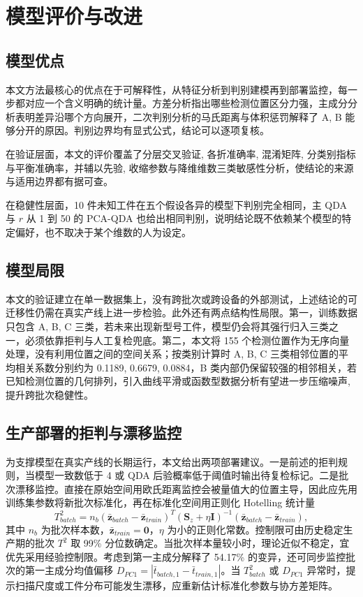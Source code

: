 \documentclass[12pt,a4paper]{article}
\newcommand{\upcite}[1]{\cite{#1}}
\begin{document}
\section{模型评价与改进}
\subsection{模型优点}

本文方法最核心的优点在于可解释性，从特征分析到判别建模再到部署监控，每一步都对应一个含义明确的统计量。方差分析指出哪些检测位置区分力强，主成分分析表明差异沿哪个方向展开，二次判别分析的马氏距离与体积惩罚解释了 A, B 能够分开的原因。判别边界均有显式公式，结论可以逐项复核。

在验证层面，本文的评价覆盖了分层交叉验证, 各折准确率, 混淆矩阵, 分类别指标与平衡准确率，并辅以先验, 收缩参数与降维维数三类敏感性分析，使结论的来源与适用边界都有据可查。

在稳健性层面，10 件未知工件在五个假设各异的模型下判别完全相同，主 QDA 与 $r$ 从 1 到 50 的 PCA-QDA 也给出相同判别，说明结论既不依赖某个模型的特定偏好，也不取决于某个维数的人为设定。

\subsection{模型局限}

本文的验证建立在单一数据集上，没有跨批次或跨设备的外部测试，上述结论的可迁移性仍需在真实产线上进一步检验。此外还有两点结构性局限。第一，训练数据只包含 A, B, C 三类，若未来出现新型号工件，模型仍会将其强行归入三类之一，必须依靠拒判与人工复检兜底。第二，本文将 155 个检测位置作为无序向量处理，没有利用位置之间的空间关系；按类别计算时 A, B, C 三类相邻位置的平均相关系数分别约为 0.1189, 0.6679, 0.0884，B 类内部仍保留较强的相邻相关，若已知检测位置的几何排列，引入曲线平滑或函数型数据分析有望进一步压缩噪声, 提升跨批次稳健性。

\subsection{生产部署的拒判与漂移监控}

为支撑模型在真实产线的长期运行，本文给出两项部署建议。一是前述的拒判规则，当模型一致数低于 4 或 QDA 后验概率低于阈值时输出待复检标记。二是批次漂移监控。直接在原始空间用欧氏距离监控会被量值大的位置主导，因此应先用训练集参数将新批次标准化，再在标准化空间用正则化 Hotelling 统计量\upcite{jiangfeng2022}
\begin{equation}
T^2_{batch}=n_b(\bar{\mathbf{z}}_{batch}-\bar{\mathbf{z}}_{train})^{T}(\mathbf{S}_z+\eta\mathbf{I})^{-1}(\bar{\mathbf{z}}_{batch}-\bar{\mathbf{z}}_{train}),
\end{equation}
其中 $n_b$ 为批次样本数，$\bar{\mathbf{z}}_{train}=\mathbf{0}$，$\eta$ 为小的正则化常数。控制限可由历史稳定生产期的批次 $T^2$ 取 99\% 分位数确定。当批次样本量较小时，理论近似不稳定，宜优先采用经验控制限。考虑到第一主成分解释了 54.17\% 的变异，还可同步监控批次的第一主成分均值偏移 $D_{PC1}=|\bar{t}_{batch,1}-\bar{t}_{train,1}|$。当 $T^2_{batch}$ 或 $D_{PC1}$ 异常时，提示扫描尺度或工件分布可能发生漂移，应重新估计标准化参数与协方差矩阵。
\end{document}
